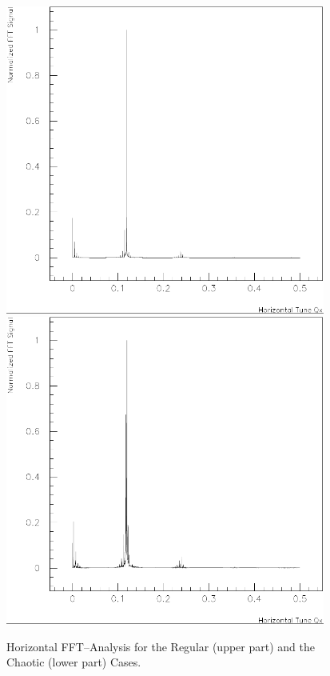 \begin{figure}[H]
\begin{center}
  \mbox{\includegraphics*[width=10.5cm]{figures/exp7}}
  \\[5mm]
  \mbox{\includegraphics*[width=10.5cm]{figures/exp15}}
 \caption{Horizontal FFT--Analysis for the Regular (upper part)
   and the Chaotic (lower part) Cases.}
 \label{P-FFT}
\end{center}
\end{figure}
